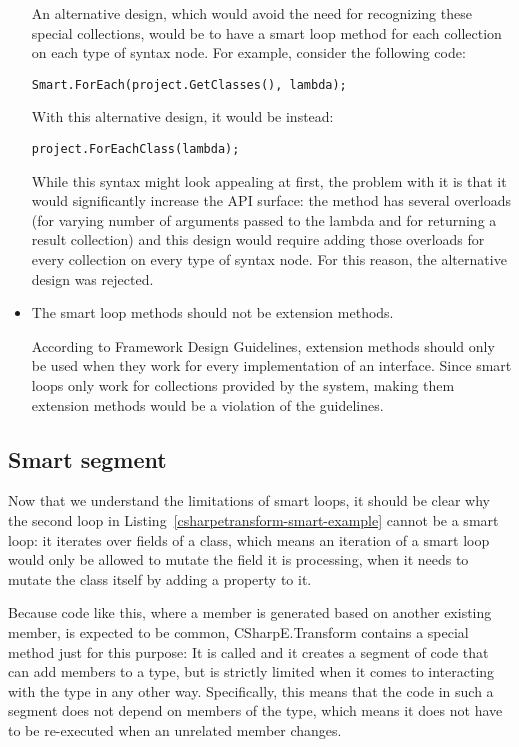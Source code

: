 \begin{itemize}
An alternative design, which would avoid the need for recognizing these special collections, would be to have a smart loop method for each collection on each type of syntax node. For example, consider the following code:

\begin{verbatim}
Smart.ForEach(project.GetClasses(), lambda);
\end{verbatim}

With this alternative design, it would be instead:

\begin{verbatim}
project.ForEachClass(lambda);
\end{verbatim}

While this syntax might look appealing at first, the problem with it is that it would significantly increase the \ac{API} surface: the  method has several overloads (for varying number of arguments passed to the lambda and for returning a result collection) and this design would require adding those overloads for every collection on every type of syntax node. For this reason, the alternative design was rejected.

\item The smart loop methods should not be extension methods.

\nopagebreak

According to Framework Design Guidelines, extension methods should only be used when they work for every implementation of an interface. \cite{fdg-extension-methods} Since smart loops only work for collections provided by the system, making them extension methods would be a violation of the guidelines.

\end{itemize}

\subsection{Smart segment}

Now that we understand the limitations of smart loops, it should be clear why the second  loop in Listing~\ref{csharpetransform-smart-example} cannot be a smart loop: it iterates over fields of a class, which means an iteration of a smart loop would only be allowed to mutate the field it is processing, when it needs to mutate the class itself by adding a property to it.

Because code like this, where a member is generated based on another existing member, is expected to be common, CSharpE.Transform contains a special method just for this purpose: It is called  and it creates a segment of code that can add members to a type, but is strictly limited when it comes to interacting with the type in any other way. Specifically, this means that the code in such a segment does not depend on members of the type, which means it does not have to be re-executed when an unrelated member changes.

